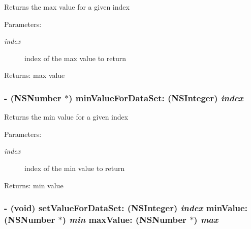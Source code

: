 Returns the max value for a given index \begin{Desc}
\item[Parameters:]
\begin{description}
\item[{\em index}]index of the max value to return \end{description}
\end{Desc}
\begin{Desc}
\item[Returns:]max value \end{Desc}
\hypertarget{interface_t_p_parameter_data_scaling_5a9973137a688517df307f31c3a0897f}{
\subsubsection[{minValueForDataSet:}]{\setlength{\rightskip}{0pt plus 5cm}- (NSNumber $\ast$) minValueForDataSet: (NSInteger) {\em index}}}
\label{interface_t_p_parameter_data_scaling_5a9973137a688517df307f31c3a0897f}


Returns the min value for a given index \begin{Desc}
\item[Parameters:]
\begin{description}
\item[{\em index}]index of the min value to return \end{description}
\end{Desc}
\begin{Desc}
\item[Returns:]min value \end{Desc}
\hypertarget{interface_t_p_parameter_data_scaling_3dfe9bc7aed1db751668d2b35ed5f96a}{
\subsubsection[{setValueForDataSet:minValue:maxValue:}]{\setlength{\rightskip}{0pt plus 5cm}- (void) setValueForDataSet: (NSInteger) {\em index}\/ minValue: (NSNumber $\ast$) {\em min}\/ maxValue: (NSNumber $\ast$) {\em max}}}
\label{interface_t_p_parameter_data_scaling_3dfe9bc7aed1db751668d2b35ed5f96a}


